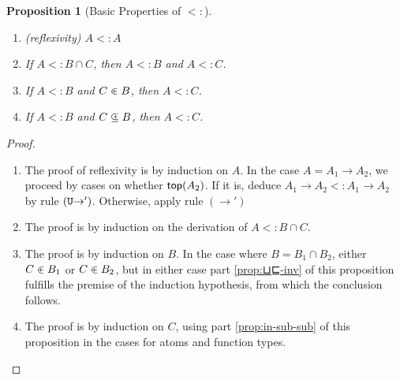 \documentclass{article}
\newtheorem{proposition}[theorem]{Proposition}
\begin{document}
\begin{proposition}[Basic Properties of $<:$]\ \label{prop:subtyping}
  \begin{enumerate}
  \item (reflexivity) $A <: A$ \label{prop:⊑-refl}
  \item If $A <: B \cap C$, then $A <: B$ and $A <: C$. \label{prop:⊔⊑-inv}
  \item If $A <: B$ and $C \inplus B$, then $A <: C$.\label{prop:in-sub-sub}
  \item If $A <: B$ and $C \subsetpluseq B$, then $A <: C$.\label{prop:subset-sub-sub}
  \end{enumerate}
\end{proposition}
\begin{proof}\ 
  \begin{enumerate}
  \item The proof of reflexivity is by induction on $A$. In the case
    $A = A_1 \to A_2$, we proceed by cases on whether $\mathsf{top}(A_2)$.
    If it is, deduce $A_1 \to A_2 <: A_1 \to A_2$ by rule $(\mathtt{U}{\to}')$.
    Otherwise, apply rule $(\to')$
  \item The proof is by induction on the derivation of $A <: B \cap C$.
  \item The proof is by induction on $B$. In the case where $B = B_1
    \cap B_2$, either $C \inplus B_1$ or $C \inplus B_2$, but in either case part
    \ref{prop:⊔⊑-inv} of this proposition fulfills the premise of
    the induction hypothesis, from which the conclusion follows.
  \item The proof  is by induction on $C$, using part \ref{prop:in-sub-sub}
    of this proposition in the cases for atoms and function types.
  \end{enumerate}
\end{proof}
\end{document}
